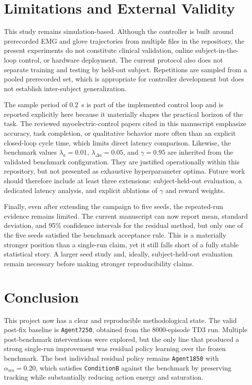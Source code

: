 \documentclass[conference]{IEEEtran}
\begin{document}
\section{Limitations and External Validity}
This study remains simulation-based. Although the controller is built around prerecorded EMG and glove trajectories from multiple files in the repository, the present experiments do not constitute clinical validation, online subject-in-the-loop control, or hardware deployment. The current protocol also does not separate training and testing by held-out subject. Repetitions are sampled from a pooled prerecorded set, which is appropriate for controller development but does not establish inter-subject generalization.

The sample period of 0.2~s is part of the implemented control loop and is reported explicitly here because it materially shapes the practical horizon of the task. The reviewed myoelectric-control papers cited in this manuscript emphasize accuracy, task completion, or qualitative behavior more often than an explicit closed-loop cycle time, which limits direct latency comparison. Likewise, the benchmark values $\lambda_a = 0.01$, $\lambda_{\Delta a} = 0.05$, and $\gamma = 0.95$ are inherited from the validated benchmark configuration. They are justified operationally within this repository, but not presented as exhaustive hyperparameter optima. Future work should therefore include at least three extensions: subject-held-out evaluation, a dedicated latency analysis, and explicit ablations of $\gamma$ and reward weights.

Finally, even after extending the campaign to five seeds, the repeated-run evidence remains limited. The current manuscript can now report mean, standard deviation, and 95\% confidence intervals for the residual method, but only one of the five seeds satisfied the benchmark acceptance rule. This is a materially stronger position than a single-run claim, yet it still falls short of a fully stable statistical story. A larger seed study and, ideally, subject-held-out evaluation remain necessary before making stronger reproducibility claims.

\section{Conclusion}
This project now has a clear and reproducible methodological state. The valid post-fix baseline is \texttt{Agent7250}, obtained from the 8000-episode TD3 run. Multiple post-benchmark interventions were explored, but the only line that produced a strong single-run improvement was residual policy learning over the frozen benchmark. The best individual residual policy remains \texttt{Agent1850} with $\alpha_{\mathrm{res}}=0.20$, which satisfies \texttt{ConditionB} against the benchmark by preserving tracking while substantially reducing action energy and saturation.
\end{document}
